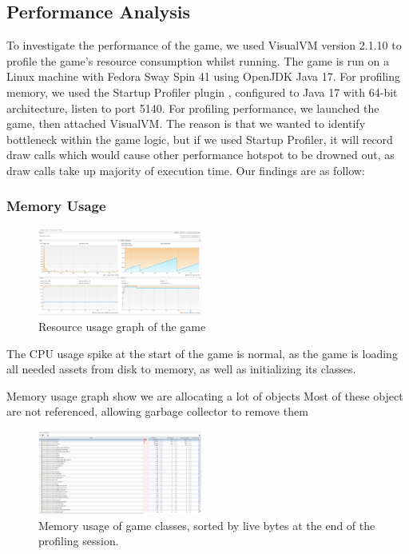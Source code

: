 \documentclass[conference]{IEEEtran}
\begin{document}
\subsection{Performance Analysis}

To investigate the performance of the game, we used VisualVM version 2.1.10 \cite{src:visual-vm} to profile the game's resource consumption whilst running.
The game is run on a Linux machine with Fedora Sway Spin 41 using OpenJDK Java 17.
For profiling memory, we used the Startup Profiler plugin \cite{src:startup-profiler}, configured to Java 17 with 64-bit architecture, listen to port 5140.
For profiling performance, we launched the game, then attached VisualVM.
The reason is that we wanted to identify bottleneck within the game logic, but if we used Startup Profiler, it will record draw calls which would cause other performance hotspot to be drowned out, as draw calls take up majority of execution time.
Our findings are as follow:

\subsubsection{Memory Usage}

\begin{figure}[htbp]
    \centerline{\includegraphics[width=0.48\textwidth]{assets/resource-usage.png}}
    \caption{Resource usage graph of the game}\label{fig:resource-usage}
\end{figure}

The CPU usage spike at the start of the game is normal, as the game is loading all needed assets from disk to memory, as well as initializing its classes.


Memory usage graph show we are allocating a lot of objects
Most of these object are not referenced, allowing garbage collector to remove them

\begin{figure}[htbp]
    \centerline{\includegraphics[width=0.48\textwidth]{assets/memory-tree.png}}
    \caption{Memory usage of game classes, sorted by live bytes at the end of the profiling session.}\label{fig:memory-tree}
\end{figure}
\end{document}
